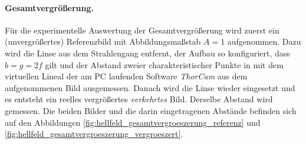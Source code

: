 \documentclass[english, ngerman]{scrartcl}
\begin{document}
\paragraph{Gesamtvergrößerung.}
Für die experimentelle Auswertung der Gesamtvergrößerung wird zuerst ein (unvergrößertes) Referenzbild mit Abbildungsmaßstab $A=1$ aufgenommen. Dazu wird die Linse aus dem Strahlengang entfernt, der Aufbau so konfiguriert, dass $b=g=2f$ gilt und der Abstand zweier charakteristischer Punkte in \si{\px} mit dem virtuellen Lineal der am PC laufenden Software \textit{ThorCam\texttrademark{}} aus dem aufgenommenen Bild ausgemessen. Danach wird die Linse wieder eingesetzt und es entsteht ein reelles vergrößertes \emph{verkehrtes} Bild. Derselbe Abstand wird gemessen. Die beiden Bilder und die darin eingetragenen Abstände befinden sich auf den Abbildungen \ref{fig:hellfeld_gesamtvergroeszerung_referenz} und \ref{fig:hellfeld_gesamtvergroeszerung_vergroeszert}.
%
\setcapindent{0pt}
\end{document}
